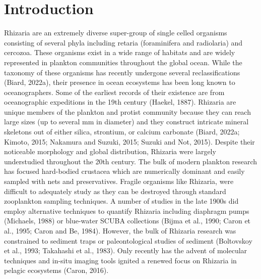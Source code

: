 \documentclass[
]{article}
\begin{document}
\hypertarget{introduction}{%
\section{Introduction}\label{introduction}}

Rhizaria are an extremely diverse super-group of single celled organisms
consisting of several phyla including retaria (foraminifera and
radiolaria) and cercozoa. These organisms exist in a wide range of
habitats and are widely represented in plankton communities throughout
the global ocean. While the taxonomy of these organisms has recently
undergone several reclassifications (Biard, 2022a), their presence in
ocean ecosystems has been long known to oceanographers. Some of the
earliest records of their existence are from oceanographic expeditions
in the 19th century (Haekel, 1887). Rhizaria are unique members of the
plankton and protist community because they can reach large sizes (up to
several mm in diameter) and they construct intricate mineral skeletons
out of either silica, strontium, or calcium carbonate (Biard, 2022a;
Kimoto, 2015; Nakamura and Suzuki, 2015; Suzuki and Not, 2015). Despite
their noticeable morphology and global distribution, Rhizaria were
largely understudied throughout the 20th century. The bulk of modern
plankton research has focused hard-bodied crustacea which are
numerically dominant and easily sampled with nets and preservatives.
Fragile organisms like Rhizaria, were difficult to adequately study as
they can be destroyed through standard zooplankton sampling techniques.
A number of studies in the late 1900s did employ alternative techniques
to quantify Rhizaria including diaphragm pumps (Michaels, 1988) or
blue-water SCUBA collections (Bijma et al., 1990; Caron et al., 1995;
Caron and Be, 1984). However, the bulk of Rhizaria research was
constrained to sediment traps or paleontological studies of sediment
(Boltovskoy et al., 1993; Takahashi et al., 1983). Only recently has the
advent of molecular techniques and in-situ imaging tools ignited a
renewed focus on Rhizaria in pelagic ecosystems (Caron, 2016).
\end{document}
